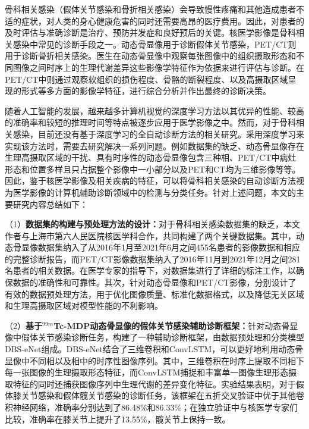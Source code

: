 \begin{cabstract}

    骨科相关感染（假体关节感染和骨折相关感染）会导致慢性疼痛和其他造成患者不适的症状，对人类的身心健康危害的同时还需要高昂的医疗费用。因此，对患者的及时评估与准确诊断是治疗、预防并发症和良好预后的关键。核医学影像是骨科相关感染中常见的诊断手段之一。动态骨显像用于诊断假体关节感染，PET/CT则用于诊断骨折相关感染。医生在动态骨显像中观察每张图像中的组织摄取形态和不同图像之间时序上的生理代谢差异这些影像学特征作为依据来进行评估与诊断。在PET/CT中则通过观察软组织的损伤程度、骨骼的断裂程度、以及高摄取区域呈现的形式等多方面的影像学特征，进行综合分析并作出最终的诊断决策。

    随着人工智能的发展，越来越多计算机视觉的深度学习方法以其优异的性能、较高的准确率和较短的推理时间等特点被逐步应用于医学影像之中。然而，对于骨科相关感染，目前还没有基于深度学习的全自动诊断方法的相关研究。采用深度学习来实现该方法时，需要去研究解决一系列问题。例如数据集的缺乏、动态骨显像存在生理高摄取区域的干扰、具有时序性的动态骨显像包含三种相、PET/CT中病灶形态和位置多样且只占据整个影像中一小部分以及PET和CT均为三维影像等等。因此，鉴于核医学影像及相关疾病的特征，可以将骨科相关感染的自动诊断方法视为医学影像的计算机辅助诊断领域中的检测与分类任务。针对上述问题，本文的主要研究内容总结如下：

    （1）\textbf{数据集的构建与预处理方法的设计：}对于骨科相关感染数据集的缺乏，本文作者与上海市第六人民医院核医学科合作，共同构建了两个关键数据集。其中，动态骨显像数据集纳入了从2016年1月至2021年6月之间455名患者的影像数据和相应的完整诊断报告，而PET/CT影像数据集纳入了2016年11月到2021年12月之间281名患者的相关数据。在医学专家的指导下，对数据集进行了详细的标注工作，以确保数据的准确性和可靠性。其次，针对动态骨显像和PET/CT影像，分别设计了有效的数据预处理方法，用于优化图像质量、标准化数据格式，以及降低无关区域和生理高摄取区域对模型性能的不利影响。

    （2）\textbf{基于\(^{99m}\)Tc-MDP动态骨显像的假体关节感染辅助诊断框架：}针对动态骨显像中假体关节感染诊断任务，构建了一种辅助诊断框架，由数据预处理和分类模型DBS-eNet组成。DBS-eNet结合了三维卷积和ConvLSTM，可以更好地利用动态骨显像中不同相以及相中的时序性图像序列。其中，三维卷积在时序上提取不同相下每一张图像的生理摄取形态特征，而ConvLSTM捕捉和丰富单一图像生理形态摄取特征的同时还捕获图像序列中生理代谢的差异变化特征。实验结果表明，对于假体膝关节感染和假体髋关节感染的诊断任务，该框架在五折交叉验证中优于其他卷积神经网络，准确率分别达到了86.48\%和86.33\%；在独立验证中与核医学专家们比较，准确率在膝关节上提升了13.55\%，髋关节上保持一致。


\end{cabstract}
